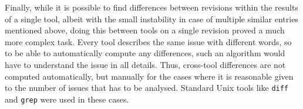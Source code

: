 Finally, while it is possible to find differences between revisions within the
results of a single tool, albeit with the small instability in case of multiple
similar entries mentioned above, doing this between tools on a single revision
proved a much more complex task. Every tool describes the same issue with
different words, so to be able to automatically compute any differences, such
an algorithm would have to understand the issue in all details. Thus,
cross-tool differences are not computed automatically, but manually for the
cases where it is reasonable given to the number of issues that has to be
analysed. Standard Unix tools like {\tt diff} and {\tt grep} were used in these
cases.
